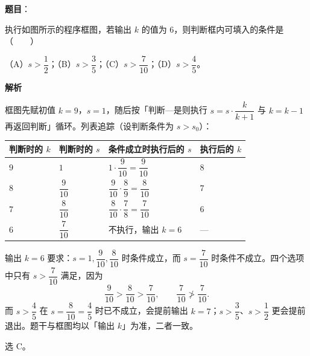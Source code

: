 \begin{answer}

\textbf{题目}：

执行如图所示的程序框图，若输出 $k$ 的值为 $6$，则判断框内可填入的条件是\mbox{（　　）}

（A）$s>\dfrac12$；（B）$s>\dfrac35$；（C）$s>\dfrac7{10}$；（D）$s>\dfrac45$。
\nopagebreak[4]
\begin{center}\end{center}
\nopagebreak[4]
\textbf{解析}

框图先赋初值 $k=9$，$s=1$，随后按「判断—是则执行 $s=s\cdot\dfrac{k}{k+1}$ 与 $k=k-1$ 再返回判断」循环。列表追踪（设判断条件为 $s>s_0$）：

\begin{center}
\begin{tabular}{llll}
\toprule
判断时的 $k$ & 判断时的 $s$ & 条件成立时执行后的 $s$ & 执行后的 $k$ \\
\midrule
$9$ & $1$ & $1\cdot\dfrac9{10}=\dfrac9{10}$ & $8$ \\
$8$ & $\dfrac9{10}$ & $\dfrac9{10}\cdot\dfrac89=\dfrac8{10}$ & $7$ \\
$7$ & $\dfrac8{10}$ & $\dfrac8{10}\cdot\dfrac78=\dfrac7{10}$ & $6$ \\
$6$ & $\dfrac7{10}$ & 不执行，输出 $k=6$ & — \\
\bottomrule
\end{tabular}
\end{center}

输出 $k=6$ 要求：$s=1,\dfrac9{10},\dfrac8{10}$ 时条件成立，而 $s=\dfrac7{10}$ 时条件不成立。四个选项中只有 $s>\dfrac7{10}$ 满足，因为
\nopagebreak[4]
\[\frac9{10}>\frac8{10}>\frac7{10},\qquad \frac7{10}\not>\frac7{10}.\]
而 $s>\dfrac45$ 在 $s=\dfrac8{10}=\dfrac45$ 时已不成立，会提前输出 $k=7$；$s>\dfrac35$、$s>\dfrac12$ 更会提前退出。题干与框图均以「输出 $k$」为准，二者一致。

选 C。


\end{answer}
